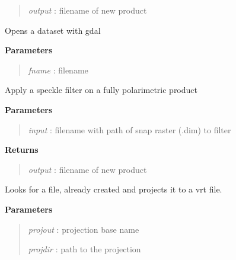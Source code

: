 \documentclass[letterpaper,10pt,openany,oneside]{sphinxmanual}
\begin{document}
\begin{fulllineitems}
\begin{fulllineitems}
\begin{quote}
\emph{output} : filename of new product
\end{quote}

\end{fulllineitems}


\begin{fulllineitems}
\label{code:Image.Image.openDataset}
Opens a dataset with gdal

\textbf{Parameters}
\begin{quote}

\emph{fname} : filename
\end{quote}

\end{fulllineitems}


\begin{fulllineitems}
\label{code:Image.Image.polarFilter}
Apply a speckle filter on a fully polarimetric product

\textbf{Parameters}
\begin{quote}

\emph{input} : filename with path of snap raster (.dim) to filter
\end{quote}

\textbf{Returns}
\begin{quote}

\emph{output} : filename of new product
\end{quote}

\end{fulllineitems}


\begin{fulllineitems}
\label{code:Image.Image.projectImg}
Looks for a file, already created and projects it to a vrt file.

\textbf{Parameters}
\begin{quote}

\emph{projout}  : projection base name

\emph{projdir}  : path to the projection


\end{quote}
\end{fulllineitems}
\end{fulllineitems}
\end{document}
